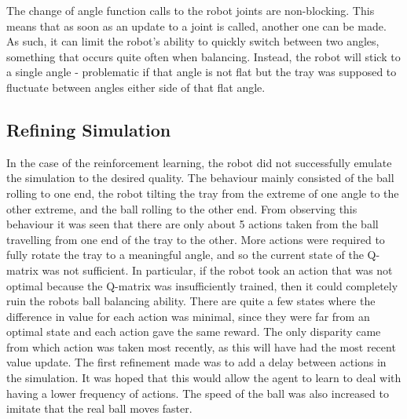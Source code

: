 \documentclass[12pt,a4paper]{article}
\begin{document}
The change of angle function calls to the robot joints are non-blocking. This means that as soon as an update to a joint is called, another one can be made. As such, it can limit the robot's ability to quickly switch between two angles, something that occurs quite often when balancing. Instead, the robot will stick to a single angle - problematic if that angle is not flat but the tray was supposed to fluctuate between angles either side of that flat angle. 

\subsection{Refining Simulation}
In the case of the reinforcement learning, the robot did not successfully emulate the simulation to the desired quality. The behaviour mainly consisted of the ball rolling to one end, the robot tilting the tray from the extreme of one angle to the other extreme, and the ball rolling to the other end. From observing this behaviour it was seen that there are only about 5 actions taken from the ball travelling from one end of the tray to the other. More actions were required to fully rotate the tray to a meaningful angle, and so the current state of the Q-matrix was not sufficient. In particular, if the robot took an action that was not optimal because the Q-matrix was insufficiently trained, then it could completely ruin the robots ball balancing ability. There are quite a few states where the difference in value for each action was minimal, since they were far from an optimal state and each action gave the same reward. The only disparity came from which action was taken most recently, as this will have had the most recent value update. The first refinement made was to add a delay between actions in the simulation. It was hoped that this would allow the agent to learn to deal with having a lower frequency of actions. The speed of the ball was also increased to imitate that the real ball moves faster.

\end{document}
